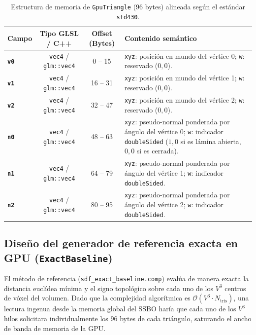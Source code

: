 \begin{table}[htbp]
  \centering
  \small
  \caption{Estructura de memoria de \texttt{GpuTriangle} (96 bytes) alineada según el estándar \texttt{std430}.}
  \label{tab:gputriangle_layout}
  \begin{tabularx}{\textwidth}{|>{\bfseries}l|c|c|>{\raggedright\arraybackslash}X|}
    \hline
    \rowcolor{tablegray} Campo & Tipo GLSL / C++ & Offset (Bytes) & Contenido semántico \\ \hline
    \texttt{v0} & \texttt{vec4} / \texttt{glm::vec4} & 0 -- 15 & \texttt{xyz}: posición en mundo del vértice 0; \texttt{w}: reservado ($0,0$). \\ \hline
    \texttt{v1} & \texttt{vec4} / \texttt{glm::vec4} & 16 -- 31 & \texttt{xyz}: posición en mundo del vértice 1; \texttt{w}: reservado ($0,0$). \\ \hline
    \texttt{v2} & \texttt{vec4} / \texttt{glm::vec4} & 32 -- 47 & \texttt{xyz}: posición en mundo del vértice 2; \texttt{w}: reservado ($0,0$). \\ \hline
    \texttt{n0} & \texttt{vec4} / \texttt{glm::vec4} & 48 -- 63 & \texttt{xyz}: pseudo-normal ponderada por ángulo del vértice 0; \texttt{w}: indicador \texttt{doubleSided} ($1,0$ si es lámina abierta, $0,0$ si es cerrada). \\ \hline
    \texttt{n1} & \texttt{vec4} / \texttt{glm::vec4} & 64 -- 79 & \texttt{xyz}: pseudo-normal ponderada por ángulo del vértice 1; \texttt{w}: indicador \texttt{doubleSided}. \\ \hline
    \texttt{n2} & \texttt{vec4} / \texttt{glm::vec4} & 80 -- 95 & \texttt{xyz}: pseudo-normal ponderada por ángulo del vértice 2; \texttt{w}: indicador \texttt{doubleSided}. \\ \hline
  \end{tabularx}
\end{table}

\subsection{Diseño del generador de referencia exacta en GPU (\texttt{ExactBaseline})}

El método de referencia (\texttt{sdf\_exact\_baseline.comp}) evalúa de manera exacta la distancia euclídea mínima y el signo topológico sobre cada uno de los $V^3$ centros de vóxel del volumen. Dado que la complejidad algorítmica es $\mathcal{O}(V^3 \cdot N_{\text{tris}})$, una lectura ingenua desde la memoria global del SSBO haría que cada uno de los $V^3$ hilos solicitara individualmente los 96 bytes de cada triángulo, saturando el ancho de banda de memoria de la GPU.

